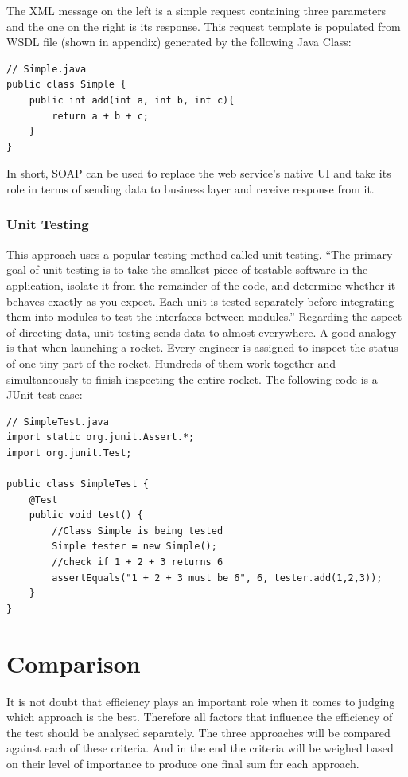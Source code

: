 \documentclass[12pt]{article}
\begin{document}
The XML message on the left is a simple request containing three parameters and the one on the right is its response. This request template is populated from WSDL file (shown in appendix) generated by the following Java Class:\\

\begin{lstlisting}
// Simple.java
public class Simple {
	public int add(int a, int b, int c){
		return a + b + c;
	}
}

\end{lstlisting}

In short, SOAP can be used to replace the web service's native UI and take its role in terms of sending data to business layer and receive response from it.

\subsubsection{Unit Testing}
This approach uses a popular testing method called unit testing. “The primary goal of unit testing is to take the smallest piece of testable software in the application, isolate it from the remainder of the code, and determine whether it behaves exactly as you expect. Each unit is tested separately before integrating them into modules to test the interfaces between modules.”\cite{unit} Regarding the aspect of directing data, unit testing sends data to almost everywhere. A good analogy is that when launching a rocket. Every engineer is assigned to inspect the status of one tiny part of the rocket. Hundreds of them work together and simultaneously to finish inspecting the entire rocket. The following code is a JUnit test case:\\
\begin{lstlisting}
// SimpleTest.java
import static org.junit.Assert.*;
import org.junit.Test;

public class SimpleTest {
	@Test
	public void test() {
		//Class Simple is being tested
		Simple tester = new Simple();
		//check if 1 + 2 + 3 returns 6
		assertEquals("1 + 2 + 3 must be 6", 6, tester.add(1,2,3));
	}
}
\end{lstlisting}
\newpage

\section{Comparison}
It is not doubt that efficiency plays an important role when it comes to judging which approach is the best. Therefore all factors that influence the efficiency of the test should be analysed separately.  The three approaches will be compared against each of these criteria. And in the end the criteria will be weighed based on their level of importance to produce one final sum for each approach.\\
\end{document}
